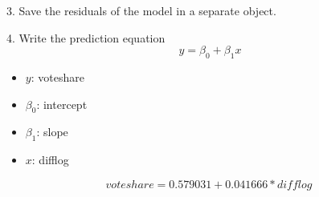 \documentclass[12pt,letterpaper]{article}
\begin{document}
\begin{enumerate}
		\vspace{.25cm}
	\end{enumerate}
	 \begin{enumerate}
	 	3. Save the residuals of the model in a separate object.	\vspace{0.2cm}
	 	
	
	 	4. Write the prediction equation
	 	\vspace{.25cm}
	 	\begin{equation}
	 		\ y = \beta_0 + \beta_1 x
	 	\end{equation}
	 	\begin{itemize}
	 	\item \( y \): voteshare
	 	\item \(\beta_0\): intercept
	 	\item \(\beta_1 \): slope
	 	\item \( x \): difflog
	 	\end{itemize}
	 	\begin{equation}
	 		voteshare = 0.579031+0.041666*difflog
	 	\end{equation}
	 	
	 	\end{enumerate}
	
\newpage
\end{document}
